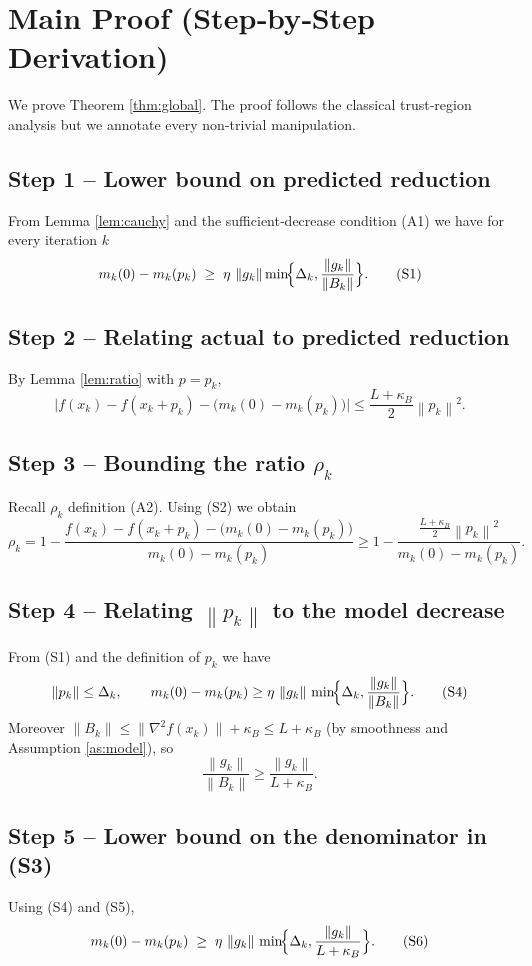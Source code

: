 \documentclass[11pt]{article}
\newcommand{\norm}[1]{\left\lVert#1\right\rVert}
\begin{document}
\section*{Main Proof (Step‑by‑Step Derivation)}
We prove Theorem \ref{thm:global}.  The proof follows the classical trust‑region analysis but we annotate every non‑trivial manipulation.

\subsection*{Step 1 – Lower bound on predicted reduction}
From Lemma \ref{lem:cauchy} and the sufficient‑decrease condition (A1) we have for every iteration $k$
\[
m_k(0)-m_k(p_k)\;\ge\;\eta\,\norm{g_k}\min\!\Bigl\{\Delta_k,\frac{\norm{g_k}}{\norm{B_k}}\Bigr\}.
\tag{S1}
\]

\subsection*{Step 2 – Relating actual to predicted reduction}
By Lemma \ref{lem:ratio} with $p=p_k$,
\[
\bigl|f(x_k)-f(x_k+p_k)-\bigl(m_k(0)-m_k(p_k)\bigr)\bigr|
\le \frac{L+\kappa_B}{2}\norm{p_k}^{2}.
\tag{S2}
\]

\subsection*{Step 3 – Bounding the ratio $\rho_k$}
Recall $\rho_k$ definition (A2). Using (S2) we obtain
\[
\rho_k
=1-\frac{f(x_k)-f(x_k+p_k)-\bigl(m_k(0)-m_k(p_k)\bigr)}{m_k(0)-m_k(p_k)}
\ge 1-\frac{\frac{L+\kappa_B}{2}\norm{p_k}^{2}}{m_k(0)-m_k(p_k)}.
\tag{S3}
\]

\subsection*{Step 4 – Relating $\norm{p_k}$ to the model decrease}
From (S1) and the definition of $p_k$ we have
\[
\norm{p_k}\le\Delta_k,\qquad
m_k(0)-m_k(p_k)\ge \eta\,\norm{g_k}\,\min\!\Bigl\{\Delta_k,\frac{\norm{g_k}}{\norm{B_k}}\Bigr\}.
\tag{S4}
\]
Moreover $\norm{B_k}\le \|\nabla^{2}f(x_k)\|+\kappa_B\le L+\kappa_B$ (by smoothness and Assumption \ref{as:model}), so
\[
\frac{\norm{g_k}}{\norm{B_k}}\ge \frac{\norm{g_k}}{L+\kappa_B}.
\tag{S5}
\]

\subsection*{Step 5 – Lower bound on the denominator in (S3)}
Using (S4) and (S5),
\[
m_k(0)-m_k(p_k)\;\ge\;\eta\,\norm{g_k}\,\min\!\Bigl\{\Delta_k,\frac{\norm{g_k}}{L+\kappa_B}\Bigr\}.
\tag{S6}
\]
\end{document}
